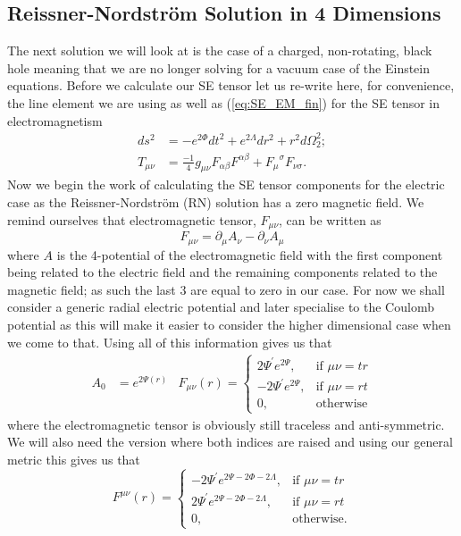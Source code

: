 \documentclass[12pt]{article}
\numberwithin{equation}{section}
\numberwithin{figure}{section}
\begin{document}
\subsection{Reissner-Nordstr\"om Solution in 4 Dimensions} %
\label{sub:reissner_nordstr"om_solution}
The next solution we will look at is the case of a charged, non-rotating, black hole meaning that we are no longer solving for a vacuum case of the Einstein equations. Before we calculate our SE tensor let us re-write here, for convenience, the line element we are using as well as (\ref{eq:SE_EM_fin}) for the SE tensor in electromagnetism
\begin{align}
	ds^2 &= -e^{2\Phi}dt^2 + e^{2\Lambda}dr^2 + r^2 d{\Omega}^2_{2};\\
	T_{\mu\nu}&=\frac{-1}{4}g_{\mu\nu}F_{\alpha\beta}F^{\alpha\beta}+  {F_\mu}^\sigma F_{\nu\sigma}.
\end{align}
Now we begin the work of calculating the SE tensor components for the electric case as the Reissner-Nordstr\"om (RN) solution has a zero magnetic field. We remind ourselves that electromagnetic tensor, $F_{\mu\nu}$, can be written as 
\begin{equation}
	F_{\mu\nu} = \partial_{\mu}A_{\nu} - \partial_{\nu}A_{\mu}
\end{equation}
where $A$ is the 4-potential of the electromagnetic field with the first component being related to the electric field and the remaining components related to the magnetic field; as such the last 3 are equal to zero in our case. For now we shall consider a generic radial electric potential and later specialise to the Coulomb potential as this will make it easier to consider the higher dimensional case when we come to that. Using all of this information gives us that
\begin{align}
	A_{0}&=e^{2\Psi(r)}
	&F_{\mu\nu}(r)=
	\begin{cases}
		2\Psi ^{\prime} e^{2\Psi}, &\text{if } \mu\nu=tr\\
		-2\Psi ^{\prime} e^{2\Psi}, &\text{if } \mu\nu=rt\\
		0, 	&\text{otherwise}
	\end{cases}
\end{align}
where the electromagnetic tensor is obviously still traceless and anti-symmetric. We will also need the version where both indices are raised and using our general metric this gives us that
\begin{equation}
	F^{\mu\nu}(r)=
	\begin{cases}
		-2\Psi ^{\prime} e^{2\Psi-2\Phi-2\Lambda}, &\text{if } \mu\nu=tr\\
		2\Psi ^{\prime} e^{2\Psi-2\Phi-2\Lambda}, &\text{if } \mu\nu=rt\\
		0, 	&\text{otherwise}.
	\end{cases}
\end{equation}
\end{document}
